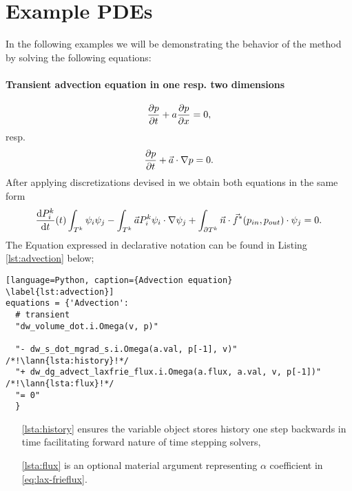 \section{Example PDEs}
In the following examples we will be demonstrating the behavior of the method by solving 
the following equations:
\paragraph{Transient advection equation in one resp. two dimensions}
\begin{equation}
    \label{eq:ex_advection}
    \frac{\partial p}{\partial t} + a\frac{\partial p}{\partial x} = 0,
\end{equation}
resp.
\begin{equation}
    \frac{\partial p}{\partial t} + \vec{a}\cdot\nabla{p} = 0.
\end{equation}
After applying discretizations devised in  we obtain both
equations in the same form
\begin{equation}
         \frac{\text{d}P^k_i}{\text{d}t}(t)\int_{T^k}\psi_i\psi_j
         - \int_{T^k} \vec{a}P_i^k\psi_i\cdot\nabla\psi_j
         + \int_{\partial{T^k}} \vec{n}
        \cdot \vec{f}^{*} (p_{in}, p_{out})\cdot\psi_j = 0.
\end{equation}
The Equation expressed in \sfepy{} declarative notation can be found in Listing
\ref{lst:advection} below;
\setcounter{lstannotation}{0}
\begin{lstlisting}[language=Python, caption={Advection equation}
\label{lst:advection}]
equations = {'Advection':
  # transient
  "dw_volume_dot.i.Omega(v, p)"

  "- dw_s_dot_mgrad_s.i.Omega(a.val, p[-1], v)" /*!\lann{lsta:history}!*/
  "+ dw_dg_advect_laxfrie_flux.i.Omega(a.flux, a.val, v, p[-1])"  /*!\lann{lsta:flux}!*/
  "= 0"
  }
\end{lstlisting}
\begin{itemize}
    \item[\ref{lsta:history}]  ensures the variable object
    stores history one step backwards in time facilitating forward nature of
    time stepping solvers,
    \item[\ref{lsta:flux}]  is an optional material argument
    representing $\alpha$ coefficient in \eqref{eq:lax-frieflux}.
\end{itemize}
